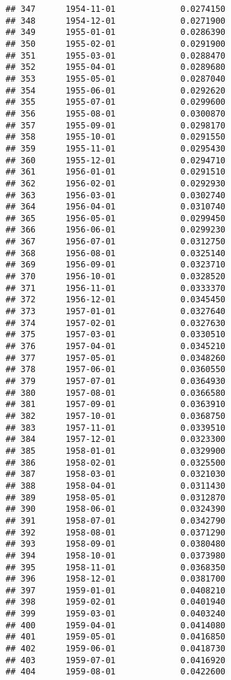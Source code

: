 \documentclass[
]{article}
\begin{document}
\begin{verbatim}
## 347      1954-11-01             0.0274150
## 348      1954-12-01             0.0271900
## 349      1955-01-01             0.0286390
## 350      1955-02-01             0.0291900
## 351      1955-03-01             0.0288470
## 352      1955-04-01             0.0289680
## 353      1955-05-01             0.0287040
## 354      1955-06-01             0.0292620
## 355      1955-07-01             0.0299600
## 356      1955-08-01             0.0300870
## 357      1955-09-01             0.0298170
## 358      1955-10-01             0.0291550
## 359      1955-11-01             0.0295430
## 360      1955-12-01             0.0294710
## 361      1956-01-01             0.0291510
## 362      1956-02-01             0.0292930
## 363      1956-03-01             0.0302740
## 364      1956-04-01             0.0310740
## 365      1956-05-01             0.0299450
## 366      1956-06-01             0.0299230
## 367      1956-07-01             0.0312750
## 368      1956-08-01             0.0325140
## 369      1956-09-01             0.0323710
## 370      1956-10-01             0.0328520
## 371      1956-11-01             0.0333370
## 372      1956-12-01             0.0345450
## 373      1957-01-01             0.0327640
## 374      1957-02-01             0.0327630
## 375      1957-03-01             0.0330510
## 376      1957-04-01             0.0345210
## 377      1957-05-01             0.0348260
## 378      1957-06-01             0.0360550
## 379      1957-07-01             0.0364930
## 380      1957-08-01             0.0366580
## 381      1957-09-01             0.0363910
## 382      1957-10-01             0.0368750
## 383      1957-11-01             0.0339510
## 384      1957-12-01             0.0323300
## 385      1958-01-01             0.0329900
## 386      1958-02-01             0.0325500
## 387      1958-03-01             0.0321030
## 388      1958-04-01             0.0311430
## 389      1958-05-01             0.0312870
## 390      1958-06-01             0.0324390
## 391      1958-07-01             0.0342790
## 392      1958-08-01             0.0371290
## 393      1958-09-01             0.0380480
## 394      1958-10-01             0.0373980
## 395      1958-11-01             0.0368350
## 396      1958-12-01             0.0381700
## 397      1959-01-01             0.0408210
## 398      1959-02-01             0.0401940
## 399      1959-03-01             0.0403240
## 400      1959-04-01             0.0414080
## 401      1959-05-01             0.0416850
## 402      1959-06-01             0.0418730
## 403      1959-07-01             0.0416920
## 404      1959-08-01             0.0422600

\end{verbatim}
\end{document}
